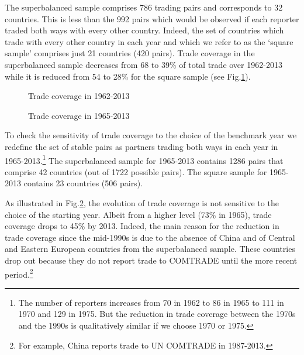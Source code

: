 \documentclass[12pt,twoside,a4paper,notitlepage]{article}
\begin{document}
{The superbalanced sample comprises 786 trading pairs and corresponds to 32 countries.
This is less than the 992 pairs which would be observed if each reporter traded both ways with every other country.
Indeed, the set of countries which trade with every other country in each year and which we refer to as the `square sample' comprises just 21 countries (420 pairs).
Trade coverage in the superbalanced sample decreases from 68 to 39\% of total trade over 1962-2013 while it is reduced from 54 to 28\% for the square sample (see Fig.\ref{fig:coverage}).


\begin{figure}[h]
\begin{center}
\setlength{\fboxrule}{1pt} %
\setlength{\fboxsep}{.1in} %
\end{center}
\caption{Trade coverage in 1962-2013 \label{fig:coverage}}
\end{figure}
\begin{figure}[h!]
\begin{center}
\setlength{\fboxrule}{1pt} %
\setlength{\fboxsep}{.1in} %
\end{center}
\caption{Trade coverage in 1965-2013 \label{fig:superbal6513}}
\end{figure}

To check the sensitivity of trade coverage to the choice of the benchmark year we redefine the set of stable pairs as partners trading both ways in each year in 1965-2013.\footnote{The number of reporters increases from 70 in 1962 to 86 in 1965 to 111 in 1970 and 129 in 1975.
But the reduction in trade coverage between the 1970s and the 1990s is qualitatively similar if we choose 1970 or 1975.} The superbalanced sample for 1965-2013 contains 1286 pairs that comprise 42 countries (out of 1722 possible pairs).
The square sample for 1965-2013 contains 23 countries (506 pairs).

As illustrated in Fig.\ref{fig:superbal6513}, the evolution of trade coverage is not sensitive to the choice of the starting year.
Albeit from a higher level (73\% in 1965), trade coverage drops to 45\% by 2013.
Indeed, the main reason for the reduction in trade coverage since the mid-1990s is due to the absence of China and of Central and Eastern European countries from the superbalanced sample.
These countries drop out because they do not report trade to COMTRADE until the more recent period.\footnote{For example, China reports trade to UN COMTRADE in 1987-2013.} 

}
\end{document}
